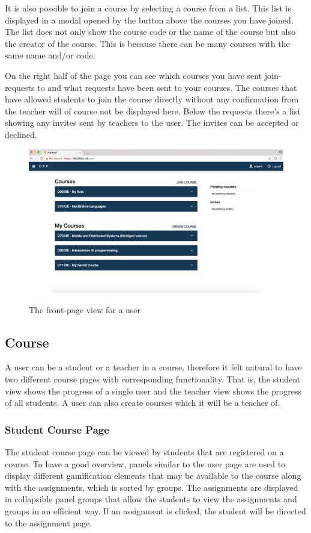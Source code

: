 It is also possible to join a course by selecting a course from a list. This list is displayed in a modal opened by the button above the courses you have joined.  The list does not only show the course code or the name of the course but also the creator of the course. This is because there can be many courses with the same name and/or code.

On the right half of the page you can see which courses you have sent join-requests to and what requests have been sent to your courses. The courses that have allowed students to join the course directly without any confirmation from the teacher will of course not be displayed here. Below the requests there's a list showing any invites sent by teachers to the user. The invites can be accepted or declined.
\begin{figure}[H]
    \centering
    \includegraphics[width=.5\textwidth]{img/gppinpictures/user.png}
    \label{fig:student}
    \caption{The front-page view for a user}
\end{figure}

\subsection{Course}
A user can be a student or a teacher in a course, therefore it felt natural to have two different course pages with corresponding functionality. That is, the student view shows the progress of a single user and the teacher view shows the progress of all students. A user can also create courses which it will be a teacher of. 

\subsubsection{Student Course Page}
The student course page can be viewed by students that are registered on a course. To have a good overview, panels similar to the user page are used to display different gamification elements that may be available to the course along with the assignments, which is sorted by groups. The assignments are displayed in collapsible panel groups that allow the students to view the assignments and groups in an efficient way. If an assignment is clicked, the student will be directed to the assignment page. 

